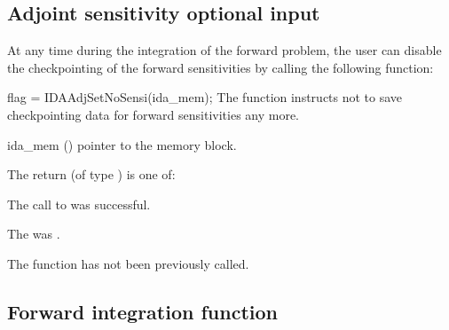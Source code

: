 \subsection{Adjoint sensitivity optional input}

At any time during the integration of the forward problem, the user
can disable the checkpointing of the forward sensitivities by calling
the following function:

{
  flag = IDAAdjSetNoSensi(ida\_mem);
}
{
  The function  instructs  not
  to save checkpointing data for forward sensitivities any more.
}
{
  \begin{args}
  \item[ida\_mem] ()
    pointer to the {\idas}  memory block.
  \end{args}
}
{
  The return  (of type ) is one of:
  \begin{args}
  \item[\Id{IDA\_SUCCESS}]
    The call to  was successful.
  \item[\Id{IDA\_MEM\_NULL}]
    The  was .
  \item[\Id{IDA\_NO\_ADJ}]
    The function  has not been previously called.
  \end{args}
}
{}


\subsection{Forward integration function}
\label{sss:idasolvef}

